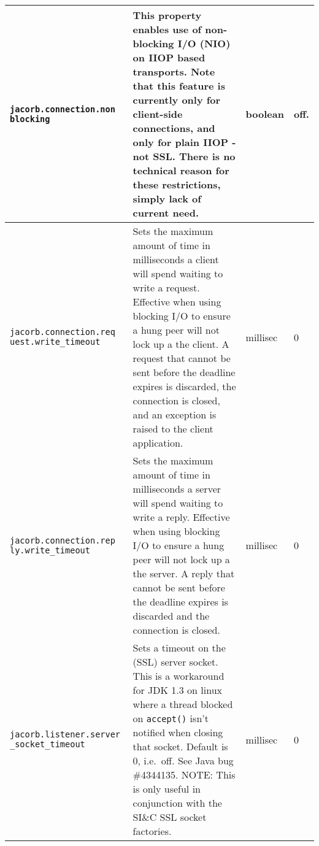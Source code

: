 \begin{small}
\begin{longtable}{|p{5cm}|p{7.5cm}|p{1.5cm}|p{1.5cm}|}
\verb"jacorb.connection.non"
\verb"blocking" & This property enables use of non-blocking I/O (NIO) on IIOP
based transports. Note that this feature is currently only for client-side
connections, and only for plain IIOP - not SSL. There is no technical reason
for these restrictions, simply lack of current need. & boolean & off. \\
\hline

\verb"jacorb.connection.req"
\verb"uest.write_timeout" & Sets the maximum amount of time in milliseconds
a client will spend waiting to write a request. Effective when using blocking
I/O to ensure a hung peer will not lock up a the client. A request that cannot
be sent before the deadline expires is discarded, the connection is closed,
and an exception is raised to the client application. & millisec & 0 \\
\hline

\verb"jacorb.connection.rep"
\verb"ly.write_timeout" & Sets the maximum amount of time in milliseconds
a server will spend waiting to write a reply. Effective when using blocking
I/O to ensure a hung peer will not lock up a the server. A reply that cannot
be sent before the deadline expires is discarded and the connection is
closed. & millisec & 0 \\
\hline

\verb"jacorb.listener.server"
\verb"_socket_timeout" & Sets a timeout on the (SSL) server socket. This is a
workaround for JDK 1.3 on linux where a thread blocked on \verb"accept()"
isn't notified when closing that socket. Default is 0, i.e.~off. See Java bug
\#4344135. NOTE: This is only useful in conjunction with the SI\&C SSL socket
factories. & millisec & 0\\
\hline


\end{longtable}
\end{small}
